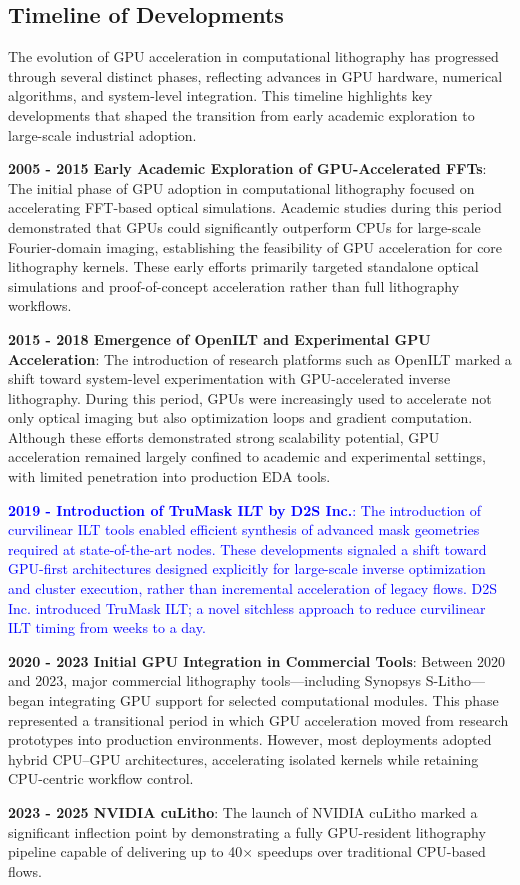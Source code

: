 \documentclass[pdflatex,sn-mathphys-num]{sn-jnl}%
\theoremstyle{thmstyleone}%
\theoremstyle{thmstyletwo}%
\theoremstyle{thmstylethree}%
\begin{document}
\subsection{Timeline of Developments}
The evolution of GPU acceleration in computational lithography has progressed through several distinct phases, reflecting advances in GPU hardware, numerical algorithms, and system-level integration. This timeline highlights key developments that shaped the transition from early academic exploration to large-scale industrial adoption.
\begin{itemize}
  \item \textbf{2005 - 2015 Early Academic Exploration of GPU-Accelerated FFTs}: The initial phase of GPU adoption in computational lithography focused on accelerating FFT-based optical simulations. Academic studies during this period demonstrated that GPUs could significantly outperform CPUs for large-scale Fourier-domain imaging, establishing the feasibility of GPU acceleration for core lithography kernels. These early efforts primarily targeted standalone optical simulations and proof-of-concept acceleration rather than full lithography workflows.
  \item \textbf{2015 - 2018 Emergence of OpenILT and Experimental GPU Acceleration}: The introduction of research platforms such as OpenILT marked a shift toward system-level experimentation with GPU-accelerated inverse lithography. During this period, GPUs were increasingly used to accelerate not only optical imaging but also optimization loops and gradient computation. Although these efforts demonstrated strong scalability potential, GPU acceleration remained largely confined to academic and experimental settings, with limited penetration into production EDA tools.
  \textcolor{blue}{\item  \textbf{2019 - Introduction of TruMask ILT by D2S Inc.}: The introduction of curvilinear ILT tools enabled efficient synthesis of advanced mask geometries required at state-of-the-art nodes. These developments signaled a shift toward GPU-first architectures designed explicitly for large-scale inverse optimization and cluster execution, rather than incremental acceleration of legacy flows.  D2S Inc. introduced TruMask ILT; a novel sitchless approach to reduce curvilinear ILT timing from weeks to a day.}
  \item \textbf{2020 - 2023 Initial GPU Integration in Commercial Tools}: Between 2020 and 2023, major commercial lithography tools—including Synopsys S-Litho—began integrating GPU support for selected computational modules. This phase represented a transitional period in which GPU acceleration moved from research prototypes into production environments. However, most deployments adopted hybrid CPU–GPU architectures, accelerating isolated kernels while retaining CPU-centric workflow control.
  \item \textbf{2023 - 2025 NVIDIA cuLitho}: The launch of NVIDIA cuLitho marked a significant inflection point by demonstrating a fully GPU-resident lithography pipeline capable of delivering up to 40× speedups over traditional CPU-based flows. 
\end{itemize}
\end{document}
